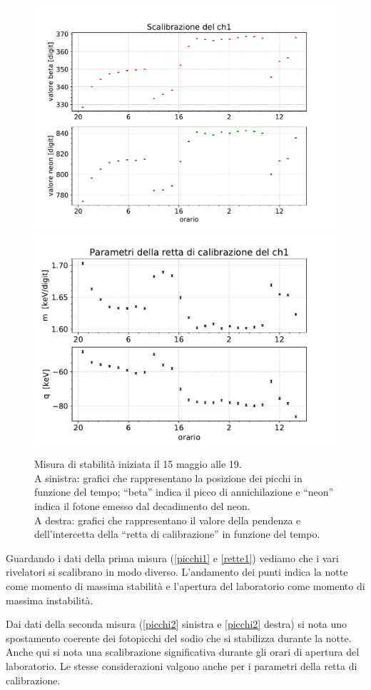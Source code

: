 \begin{figure}[h]
\centering
\subfloat
{
\includegraphics[width=19 em]{immagini/0515_picchi}
}
\subfloat
{
\includegraphics[width=19.5 em]{immagini/0515_rette}
}
\caption{Misura di stabilità iniziata il 15 maggio alle 19.\\
A sinistra:  grafici che rappresentano la posizione dei picchi in funzione del tempo; ``beta'' indica il picco di annichilazione e ``neon'' indica il fotone emesso dal decadimento del neon. \\
A destra: grafici che rappresentano il valore della pendenza e dell'intercetta della ``retta di calibrazione'' in funzione del tempo.}
\label{picchi2}
\end{figure}

Guardando i dati della prima misura (\autoref{picchi1} e \autoref{rette1}) vediamo che i vari rivelatori si scalibrano in modo diverso. L'andamento dei punti indica la notte come momento di massima stabilità e l'apertura del laboratorio come momento di massima instabilità.

Dai dati della seconda misura (\autoref{picchi2} sinistra e \autoref{picchi2} destra) si nota uno spostamento coerente dei fotopicchi del sodio che si stabilizza durante la notte. Anche qui si nota una scalibrazione significativa durante gli orari di apertura del laboratorio.
Le stesse considerazioni valgono anche per i parametri della retta di calibrazione.